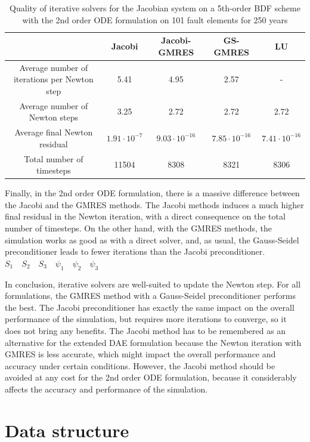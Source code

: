 \begin{table}[H]
	\begin{tabular}{ | c || c c c | c |}
		\hline
		& Jacobi & Jacobi-GMRES & GS-GMRES & LU \\ \hline\hline
		Average number of iterations per Newton step &  5.41  &    4.95   &    2.57  & -  \\
		Average number of Newton steps & 3.25  &     2.72    &   2.72  &     2.72 \\
		Average final Newton residual &   $1.91\cdot10^{-7}$  & $9.03\cdot10^{-16}$  & $7.85\cdot10^{-16}$  & $7.41\cdot10^{-16}$ \\
		Total number of timesteps & 11504  &      8308    &    8321    &    8306 \\
		 \hline
	\end{tabular}
	\caption{Quality of iterative solvers for the Jacobian system on a 5th-order BDF scheme with the 2nd order ODE formulation on 101 fault elements for 250 years}
	\label{tab:extendedODE_iterativeSolversJacobian}
\end{table}
Finally, in the 2nd order ODE formulation, there is a massive difference between the Jacobi and the GMRES methods. The Jacobi methods induces a much higher final residual in the Newton iteration, with a direct consequence on the total number of timesteps. On the other hand, with the GMRES methods, the simulation works as good as with a direct solver, and, as usual, the Gauss-Seidel preconditioner leads to fewer iterations than the Jacobi preconditioner. \\
$ S_1 \quad S_2 \quad S_3 \quad \psi_1 \quad \psi_2 \quad \psi_3$

In conclusion, iterative solvers are well-suited to update the Newton step. For all formulations, the GMRES method with a Gauss-Seidel preconditioner performs the best. The Jacobi preconditioner has exactly the same impact on the overall performance of the simulation, but requires more iterations to converge, so it does not bring any benefits. The Jacobi method has to be remembered as an alternative for the extended DAE formulation because the Newton iteration with GMRES is less accurate, which might impact the overall performance and accuracy under certain conditions. However, the Jacobi method should be avoided at any cost for the 2nd order ODE formulation, because it considerably affects the accuracy and performance of the simulation. 
	
\section{Data structure}
